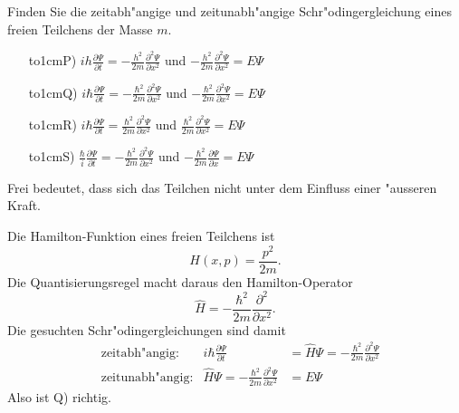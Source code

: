 Finden Sie die zeitabh"angige und zeitunabh"angige Schr"odingergleichung
eines freien Teilchens der Masse $m$.
\begin{itemize}
\item[\hbox to1cm{P)\hfill}]
$i h\frac{\partial\Psi}{\partial t}
=
-\frac{h^2}{2m}\frac{\partial^2\Psi}{\partial x^2}$
und
$-\frac{h^2}{2m}\frac{\partial^2\Psi}{\partial x^2}
=E\Psi$
\item[\hbox to1cm{Q)\hfill}]
$i\hbar\frac{\partial\Psi}{\partial t}
=
-\frac{\hbar^2}{2m}\frac{\partial^2\Psi}{\partial x^2}$
und
$-\frac{\hbar^2}{2m}\frac{\partial^2\Psi}{\partial x^2}
=E\Psi$
\item[\hbox to1cm{R)\hfill}]
$i\hbar\frac{\partial\Psi}{\partial t}
=
\frac{\hbar^2}{2m}\frac{\partial^2\Psi}{\partial x^2}$
und
$\frac{\hbar^2}{2m}\frac{\partial^2\Psi}{\partial x^2}
=E\Psi$
\item[\hbox to1cm{S)\hfill}]
$\frac{\hbar}{i}\frac{\partial\Psi}{\partial t}
=
-\frac{\hbar^2}{2m}\frac{\partial^2\Psi}{\partial x^2}$
und
$-\frac{\hbar^2}{2m}\frac{\partial\Psi}{\partial x}
=E\Psi$
\end{itemize}

\begin{hinweis}
Frei bedeutet, dass sich das Teilchen nicht unter dem Einfluss einer
"ausseren Kraft.
\end{hinweis}

\begin{loesung}
Die Hamilton-Funktion eines freien Teilchens ist
\[
H(x,p)=\frac{p^2}{2m}.
\]
Die Quantisierungsregel macht daraus den Hamilton-Operator
\[
\hat H=-\frac{\hbar^2}{2m}\frac{\partial^2}{\partial x^2}.
\]
Die gesuchten Schr"odingergleichungen sind damit
\begin{align*}
&\text{zeitabh"angig:}&
i\hbar \frac{\partial \Psi}{\partial t}&=\hat H\Psi=-\frac{\hbar^2}{2m}\frac{\partial^2\Psi}{\partial x^2}\\
&\text{zeitunabh"angig:}&
\hat H\Psi=-\frac{\hbar^2}{2m}\frac{\partial^2\Psi}{\partial x^2}&=E\Psi
\end{align*}
Also ist Q) richtig.
\end{loesung}

